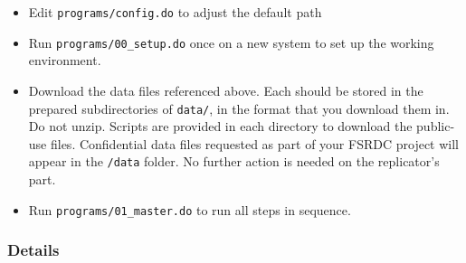 \documentclass[
]{article}
\providecommand{\tightlist}{%
  \setlength{\itemsep}{0pt}\setlength{\parskip}{0pt}}
\begin{document}
\begin{itemize}
\tightlist
\item
  Edit \texttt{programs/config.do} to adjust the default path
\item
  Run \texttt{programs/00\_setup.do} once on a new system to set up the
  working environment.
\item
  Download the data files referenced above. Each should be stored in the
  prepared subdirectories of \texttt{data/}, in the format that you
  download them in. Do not unzip. Scripts are provided in each directory
  to download the public-use files. Confidential data files requested as
  part of your FSRDC project will appear in the \texttt{/data} folder.
  No further action is needed on the replicator's part.
\item
  Run \texttt{programs/01\_master.do} to run all steps in sequence.
\end{itemize}

\hypertarget{details-1}{%
\subsubsection{Details}\label{details-1}}
\end{document}
